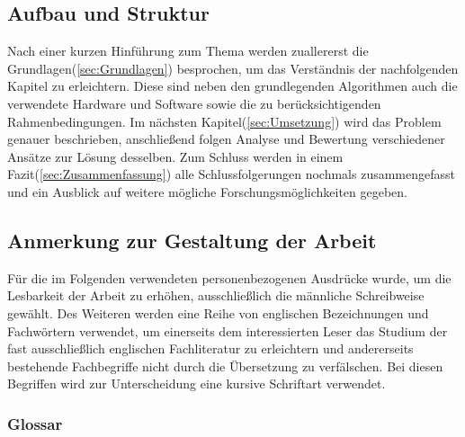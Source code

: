 \subsection{Aufbau und Struktur}
Nach einer kurzen Hinführung zum Thema werden zuallererst die Grundlagen(\ref{sec:Grundlagen}) besprochen, um das Verständnis der nachfolgenden Kapitel zu erleichtern. Diese sind neben den grundlegenden Algorithmen auch die verwendete Hardware und Software sowie die zu berücksichtigenden Rahmenbedingungen. Im nächsten Kapitel(\ref{sec:Umsetzung}) wird das Problem genauer beschrieben, anschließend folgen Analyse und Bewertung verschiedener Ansätze zur Lösung desselben. Zum Schluss werden in einem Fazit(\ref{sec:Zusammenfassung}) alle Schlussfolgerungen nochmals zusammengefasst und ein Ausblick auf weitere mögliche Forschungsmöglichkeiten gegeben. \\ 


\subsection{Anmerkung zur Gestaltung der Arbeit}
Für die im Folgenden verwendeten personenbezogenen
Ausdrücke wurde, um die Lesbarkeit der Arbeit zu erhöhen,
ausschließlich die männliche Schreibweise gewählt. Des Weiteren werden eine
Reihe von englischen Bezeichnungen und Fachwörtern verwendet, um einerseits dem
interessierten Leser das Studium der fast ausschließlich englischen
Fachliteratur zu erleichtern und andererseits bestehende Fachbegriffe nicht durch die Übersetzung zu verfälschen. Bei diesen Begriffen wird zur Unterscheidung eine kursive Schriftart verwendet.

\subsubsection{Glossar}


